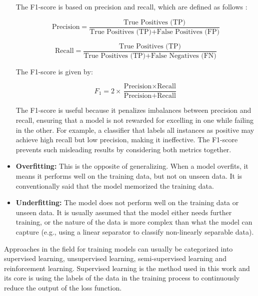 \begin{itemize}
    The F1-score  is based on precision and recall, which are defined as follows \cite{lipton2014thresholding}:

    \begin{equation}
    \text{Precision} = \frac{\text{True Positives (TP)}}{\text{True Positives (TP)} + \text{False Positives (FP)}}
    \end{equation}

    \begin{equation}
    \text{Recall} = \frac{\text{True Positives (TP)}}{\text{True Positives (TP)} + \text{False Negatives (FN)}}
    \end{equation}

    The F1-score is given by:

    \begin{equation}
    F_1 = 2 \times \frac{\text{Precision} \times \text{Recall}}{\text{Precision} + \text{Recall}}
    \end{equation}

    The F1-score is useful because it penalizes imbalances between precision and recall, ensuring that a model is not rewarded for excelling in one while failing in the other. For example, a classifier that labels all instances as positive may achieve high recall but low precision, making it ineffective. The F1-score prevents such misleading results by considering both metrics together.

    \item \textbf{Overfitting:}
    This is the opposite of generalizing. When a model overfits, it means it performs well on the training data, but not on unseen data. It is conventionally said that the model memorized the training data.

    \item \textbf{Underfitting:}
    The model does not perform well on the training data or unseen data. It is usually assumed that the model either needs further training, or the nature of the data is more complex than what the model can capture (e.g., using a linear separator to classify non-linearly separable data).
    
\end{itemize}
    Approaches in the field for training models can usually be categorized into supervised learning, unsupervised learning, semi-supervised learning and reinforcement learning. Supervised learning is the method used in this work and its core is using the labels of the data in the training process to continuously reduce the output of the loss function.
    
